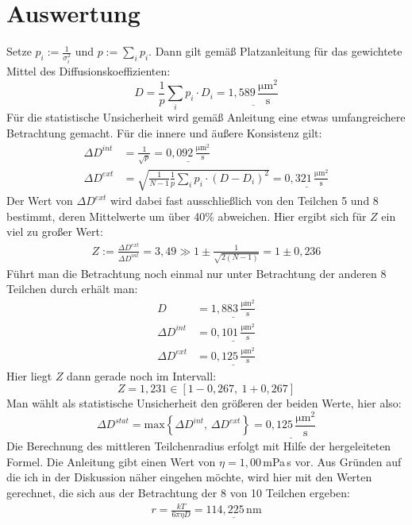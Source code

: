 \documentclass[a4paper,12pt]{article}
\newcommand{\kla}{}
\newcommand{\klammer}{}
\begin{document}
\section{Auswertung}
Setze $p_i:=\frac{1}{\sigma_i^2}$ und $p:=\sum_i p_i$. Dann gilt gemäß Platzanleitung für das gewichtete Mittel des Diffusionskoeffizienten:
$$D=\frac{1}{p}\sum_i p_i\cdot D_i=\underline{1,589\,\frac{\mathrm{\mu m}^2}{\mathrm{s}}}$$
Für die statistische Unsicherheit wird gemäß Anleitung eine etwas umfangreichere Betrachtung gemacht. Für die innere und äußere Konsistenz gilt:
\begin{align*}
\Delta D^{int}&=\frac{1}{\sqrt{p}}=\underline{0,092\,\frac{\mathrm{\mu m}^2}{\mathrm{s}}} \\
\Delta D^{ext}&=\sqrt{\frac{1}{N-1}\frac{1}{p}\sum_i p_i\cdot \kla\left( {D-D_i} \right)^2}=\underline{0,321\,\frac{\mathrm{\mu m}^2}{\mathrm{s}}}
\end{align*}
Der Wert von $\Delta D^{ext}$ wird dabei fast ausschließlich von den Teilchen 5 und 8 bestimmt, deren Mittelwerte um über 40\% abweichen. Hier ergibt sich für $Z$ ein viel zu großer Wert:
\begin{align*}
Z:=\frac{\Delta D^{ext}}{\Delta D^{int}}=3,49\gg 1\pm\frac{1}{\sqrt{2(N-1)}}=1\pm 0,236
\end{align*} 
Führt man die Betrachtung noch einmal nur unter Betrachtung der anderen 8 Teilchen durch erhält man:
\begin{align*}
D&=\underline{1,883\,\frac{\mathrm{\mu m}^2}{\mathrm{s}}}\\
\Delta D^{int}&=\underline{0,101\,\frac{\mathrm{\mu m}^2}{\mathrm{s}}}\\
\Delta D^{ext}&=\underline{0,125\,\frac{\mathrm{\mu m}^2}{\mathrm{s}}}
\end{align*}
Hier liegt $Z$ dann gerade noch im Intervall:
$$Z=1,231\in [1-0,267,\ 1+0,267]$$
Man wählt als statistische Unsicherheit den größeren der beiden Werte, hier also:
$$\Delta D^{stat}=\mathrm{max}\klammer\left\{ {\Delta D^{int},\,\Delta D^{ext}} \right\}=\underline{0,125\,\frac{\mathrm{\mu m}^2}{\mathrm{s}}}$$
Die Berechnung des mittleren Teilchenradius erfolgt mit Hilfe der hergeleiteten Formel. Die Anleitung gibt einen Wert von $\eta = 1,00\,$mPa\,s vor. Aus Gründen auf die ich in der Diskussion näher eingehen möchte, wird hier mit den Werten gerechnet, die sich aus der Betrachtung der 8 von 10 Teilchen ergeben:
\begin{align*}
r=\frac{kT}{6\pi\eta D}=\underline{114,225\,\mathrm{nm}}
\end{align*}
\end{document}
